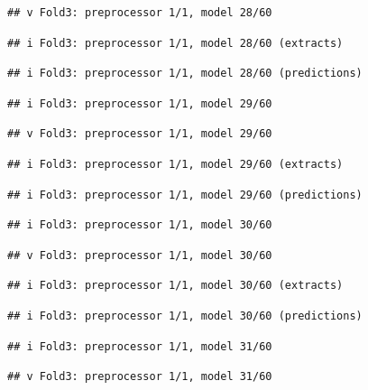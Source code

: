 \documentclass[
]{article}
\begin{document}
\begin{verbatim}
## v Fold3: preprocessor 1/1, model 28/60
\end{verbatim}

\begin{verbatim}
## i Fold3: preprocessor 1/1, model 28/60 (extracts)
\end{verbatim}

\begin{verbatim}
## i Fold3: preprocessor 1/1, model 28/60 (predictions)
\end{verbatim}

\begin{verbatim}
## i Fold3: preprocessor 1/1, model 29/60
\end{verbatim}

\begin{verbatim}
## v Fold3: preprocessor 1/1, model 29/60
\end{verbatim}

\begin{verbatim}
## i Fold3: preprocessor 1/1, model 29/60 (extracts)
\end{verbatim}

\begin{verbatim}
## i Fold3: preprocessor 1/1, model 29/60 (predictions)
\end{verbatim}

\begin{verbatim}
## i Fold3: preprocessor 1/1, model 30/60
\end{verbatim}

\begin{verbatim}
## v Fold3: preprocessor 1/1, model 30/60
\end{verbatim}

\begin{verbatim}
## i Fold3: preprocessor 1/1, model 30/60 (extracts)
\end{verbatim}

\begin{verbatim}
## i Fold3: preprocessor 1/1, model 30/60 (predictions)
\end{verbatim}

\begin{verbatim}
## i Fold3: preprocessor 1/1, model 31/60
\end{verbatim}

\begin{verbatim}
## v Fold3: preprocessor 1/1, model 31/60
\end{verbatim}
\end{document}
